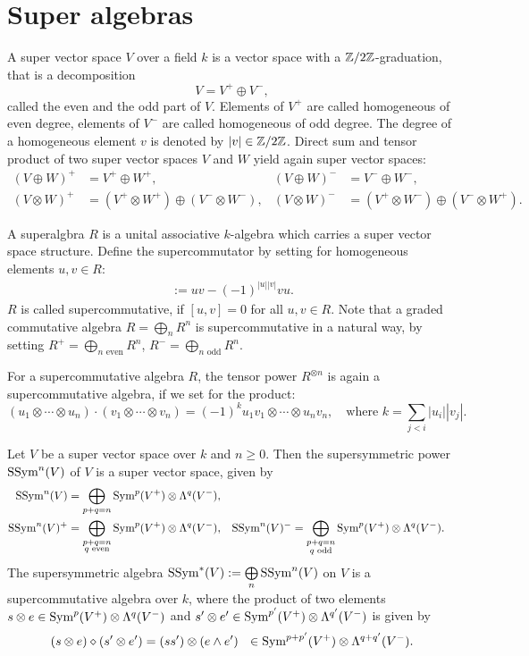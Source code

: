 \section{Super algebras} \label{SuperSection}
\begin{definition}
 A super vector space $V$ over a field $k$ is a vector space with a $\mathbb{Z}/2\mathbb{Z}$-graduation, that is a decomposition
$$
 V = V^{+} \oplus V^{-},
$$
called the even and the odd part of $V$. Elements of $V^{+}$ are called homogeneous of even degree, elements of $V^{-}$ are called homogeneous of odd degree.
The degree of a homogeneous element $v$ is denoted by $|v|\in \mathbb{Z}/2\mathbb{Z}$.
Direct sum and tensor product of two super vector spaces $V$ and $W$ yield again super vector spaces:
\begin{align*}
 (V\oplus W)^{+} &= V^{+}\oplus W^{+}, & (V\oplus W)^{-} &= V^{-}\oplus W^{-}, \\
 (V\otimes W)^{+} &= (V^{+}\otimes W^{+})\oplus (V^{-}\otimes W^{-}), & (V\otimes W)^{-} &=(V^{+}\otimes W^{-})\oplus (V^{-}\otimes W^{+}).
\end{align*}
\end{definition}
\begin{definition}
A superalgbra $R$ is a unital associative $k$-algebra which carries a super vector space structure. Define the supercommutator by setting for homogeneous elements $u,v \in R$:
\begin{align*}
[u,v] := uv - (-1)^{|u||v|} v u.
\end{align*}
$R$ is called supercommutative, if $[u,v]=0$ for all $u,v\in R$. Note that a graded commutative algebra $R = \bigoplus\limits_n R^n$ is supercommutative in a natural way, by setting $R^{+}=\bigoplus\limits_{n\text{ even}} R^n$, $R^{-}=\bigoplus\limits_{n\text{ odd}} R^n$.

For a supercommutative algebra $R$, the tensor power $R^{\otimes n}$ is again a supercommutative algebra, if we set for the product:
$$
(u_1\otimes\cdots\otimes u_n)\cdot(v_1\otimes\cdots\otimes v_n) 
=  (-1)^k u_1v_1\otimes\cdots\otimes u_nv_n ,\quad \text{where } k= {\sum_{j<i}|u_i||v_j|}.
$$
\end{definition}
\begin{definition}
Let $V$ be a super vector space over $k$ and $n\geq 0$. Then the supersymmetric power $\operatorname{SSym}^n(V)$ of $V$ is a super vector space, given by
\begin{align*}
\operatorname{SSym}^n(V) &= \bigoplus_{p+q=n} \operatorname{Sym}^p(V^{+}) \otimes \Lambda^q(V^{-}), \\
\operatorname{SSym}^n(V)^{+} &= \bigoplus_{\substack{p+q=n \\ q\text{ even} }} \operatorname{Sym}^p(V^{+}) \otimes \Lambda^q(V^{-}), &
\operatorname{SSym}^n(V)^{-} &= \bigoplus_{\substack{p+q=n \\ q\text{ odd} }} \operatorname{Sym}^p(V^{+}) \otimes \Lambda^q(V^{-}).
\end{align*}
The supersymmetric algebra $\operatorname{SSym}^*(V):= \bigoplus\limits_n \operatorname{SSym}^n(V)$ on $V$ is a supercommutative algebra over $k$, where the product of two elements $s\otimes e \in \operatorname{Sym}^p(V^{+}) \otimes \Lambda^q(V^{-})$ and $s'\otimes e' \in \operatorname{Sym}^{p'}(V^{+}) \otimes \Lambda^{q'}(V^{-})$ is given by 
$$
(s\otimes e)\diamond (s'\otimes e') = (s s')\otimes (e\wedge e') \ \  \in \operatorname{Sym}^{p+p'}(V^{+}) \otimes \Lambda^{q+q'}(V^{-}).
$$
\end{definition}
